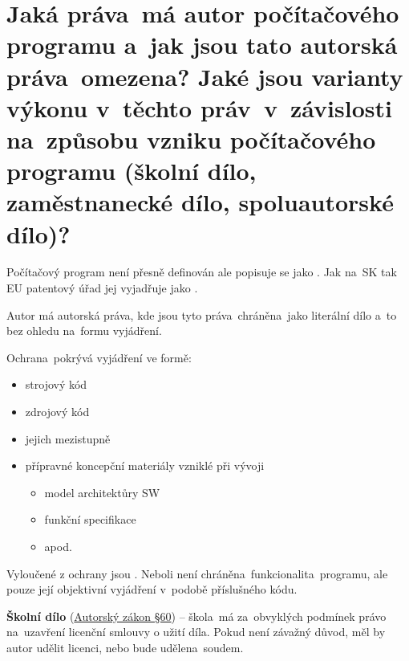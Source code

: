 \section{Jaká práva~má autor počítačového programu a~jak jsou tato autorská práva~omezena? Jaké jsou varianty výkonu v~těchto práv~v~závislosti na~způsobu vzniku počítačového programu (školní dílo, zaměstnanecké dílo, spoluautorské dílo)?}

Počítačový program není přesně definován ale popisuje se jako . Jak na~SK tak EU patentový úřad jej vyjadřuje jako .

Autor má autorská práva, kde jsou tyto práva~chráněna~jako literální dílo a~to bez ohledu na~formu vyjádření.
\newline

\noindent Ochrana~pokrývá vyjádření ve formě:
\begin{itemize}[noitemsep]
    \item strojový kód
    \item zdrojový kód
    \item jejich mezistupně
    \item přípravné koncepční materiály vzniklé při vývoji
          \begin{itemize}[noitemsep]
              \item model architektůry SW
              \item funkční specifikace
              \item apod.
          \end{itemize}
\end{itemize}

Vyloučené z ochrany jsou . Neboli není chráněna~funkcionalita~programu, ale pouze její objektivní vyjádření v~podobě příslušného kódu.

\textbf{Školní dílo} (\href{https://www.zakonyprolidi.cz/cs/2000-121#p60}{Autorský zákon §60}) -- škola~má za~obvyklých podmínek právo na~uzavření licenční smlouvy o užití díla. Pokud není závažný důvod, měl by autor udělit licenci, nebo bude udělena~soudem.

